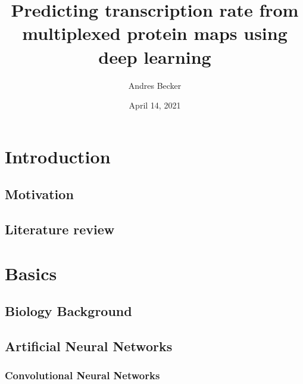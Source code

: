 \documentclass[biblatexBackend=bibtex]{tumthesis}
\author{Andres Becker}
\title{Predicting transcription rate from multiplexed protein maps using deep learning}
\institute{Chair of Mathematical Modeling of Biological Systems}
\date{April 14, 2021} %
\begin{document}
\pagestyle{empty}
\frontmatter%
\maketitlepage%





\tableofcontents%

\mainmatter%
\pagestyle{headings}

\chapter{Introduction}
\label{ch:introduction}


\section{Motivation}
\label{sec:intro:motivation}

\section{Literature review}
\label{sec:intro:literature_review}


\chapter{Basics}
\label{ch:basics}


\section{Biology Background}
\label{sec:basics:bio_back}

\section{Artificial Neural Networks}
\label{sec:basics:Cellular_Expression}

\subsection{Convolutional Neural Networks}
\label{sec:basics:CNN}
\end{document}
